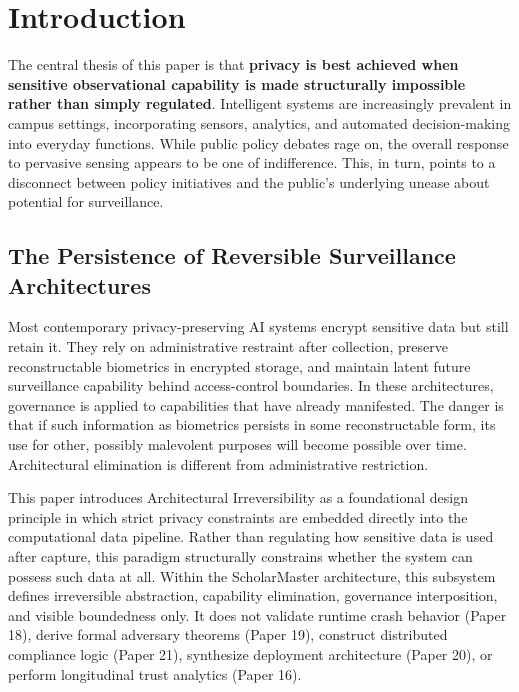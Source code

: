 \documentclass[conference]{IEEEtran}
\begin{document}
\section{Introduction}

The central thesis of this paper is that \textbf{privacy is best achieved when sensitive observational capability is made structurally impossible rather than simply regulated}. Intelligent systems are increasingly prevalent in campus settings, incorporating sensors, analytics, and automated decision-making into everyday functions. While public policy debates rage on, the overall response to pervasive sensing appears to be one of indifference. This, in turn, points to a disconnect between policy initiatives and the public's underlying unease about potential for surveillance.

\subsection{The Persistence of Reversible Surveillance Architectures}
Most contemporary privacy-preserving AI systems encrypt sensitive data but still retain it. They rely on administrative restraint after collection, preserve reconstructable biometrics in encrypted storage, and maintain latent future surveillance capability behind access-control boundaries. In these architectures, governance is applied to capabilities that have already manifested. The danger is that if such information as biometrics persists in some reconstructable form, its use for other, possibly malevolent purposes will become possible over time. Architectural elimination is different from administrative restriction.

This paper introduces Architectural Irreversibility as a foundational design principle in which strict privacy constraints are embedded directly into the computational data pipeline. Rather than regulating how sensitive data is used after capture, this paradigm structurally constrains whether the system can possess such data at all. Within the ScholarMaster architecture, this subsystem defines irreversible abstraction, capability elimination, governance interposition, and visible boundedness only. It does not validate runtime crash behavior (Paper 18), derive formal adversary theorems (Paper 19), construct distributed compliance logic (Paper 21), synthesize deployment architecture (Paper 20), or perform longitudinal trust analytics (Paper 16).
\end{document}
